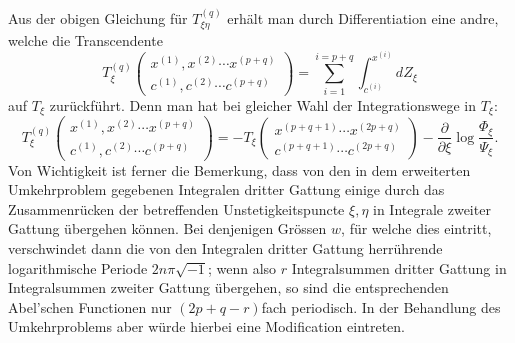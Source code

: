 \documentclass[10pt]{article}
\begin{document}
Aus der obigen Gleichung für \(T_{\xi\eta}^{(q)}\) erhält man durch Differentiation eine andre, welche die Transcendente
\[
T_{\xi}^{(q)}\begin{pmatrix}x^{(1)},x^{(2)}\cdots x^{(p+q)}\\c^{(1)},c^{(2)}\cdots c^{(p+q)}\end{pmatrix}
=\sum_{i=1}^{i=p+q}\int_{c^{(i)}}^{x^{(i)}}dZ_\xi
\]
auf \(T_\xi\) zurückführt. Denn man hat bei gleicher Wahl der Integrationswege in \(T_\xi\):
\[
T_\xi^{(q)}\begin{pmatrix}x^{(1)},x^{(2)}\cdots x^{(p+q)}\\c^{(1)},c^{(2)}\cdots c^{(p+q)}\end{pmatrix}
=-T_\xi\begin{pmatrix}x^{(p+q+1)}\cdots x^{(2p+q)}\\c^{(p+q+1)}\cdots c^{(2p+q)}\end{pmatrix}
-\frac{\partial}{\partial\xi}\log\frac{\Phi_\xi}{\Psi_\xi}.
\]
Von Wichtigkeit ist ferner die Bemerkung, dass von den in dem erweiterten Umkehrproblem gegebenen Integralen dritter Gattung einige durch das Zusammenrücken der betreffenden Unstetigkeitspuncte \(\xi,\eta\) in Integrale zweiter Gattung übergehen können. Bei denjenigen Grössen \(w\), für welche dies eintritt, verschwindet dann die von den Integralen dritter Gattung herrührende logarithmische Periode \(2n\pi\sqrt{-1}\); wenn also \(r\) Integralsummen dritter Gattung in Integralsummen zweiter Gattung übergehen, so sind die entsprechenden Abel'schen Functionen nur \((2p+q-r)\)fach periodisch. In der Behandlung des Umkehrproblems aber würde hierbei eine Modification eintreten.
\end{document}
